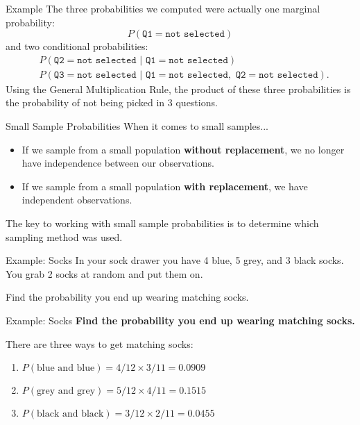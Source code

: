 \begin{frame}{Example}
    The three probabilities we computed were actually one marginal probability:
    \[
        P(\texttt{Q1}=\texttt{not selected})
    \]
    and two conditional probabilities:
    \begin{align*}
        &P (\texttt{Q2} = \texttt{not selected } | \texttt{ Q1} = \texttt{not selected}) \\
        &P (\texttt{Q3} = \texttt{not selected } | \texttt{ Q1} = \texttt{not selected}, \texttt{ Q2} = \texttt{not selected}).
    \end{align*}
    Using the General Multiplication Rule, the product of these three probabilities is the probability of not being picked in 3 questions.
\end{frame}

\begin{frame}{Small Sample Probabilities}
    When it comes to small samples...
    \begin{itemize}
        \item If we sample from a small population \textbf{without replacement}, we no longer have independence between our observations.
        \item If we sample from a small population \textbf{with replacement}, we have independent observations.
    \end{itemize}
    The key to working with small sample probabilities is to determine which sampling method was used.
\end{frame}

\begin{frame}{Example: Socks}
    In your sock drawer you have 4 blue, 5 grey, and 3 black socks. You grab 2 socks at random and put them on. 
    
    \vspace{12pt}Find the probability you end up wearing matching socks.
\end{frame}

\begin{frame}{Example: Socks}
    \textbf{Find the probability you end up wearing matching socks.}
    
    \vspace{12pt}There are three ways to get matching socks:
    \begin{enumerate}
        \item $P(\text{blue and blue}) = 4/12 \times 3/11 = 0.0909$
        \item $P(\text{grey and grey})=5/12 \times 4/11 = 0.1515$
        \item $P(\text{black and black})=3/12 \times 2/11 = 0.0455$
    \end{enumerate}
\end{frame}

